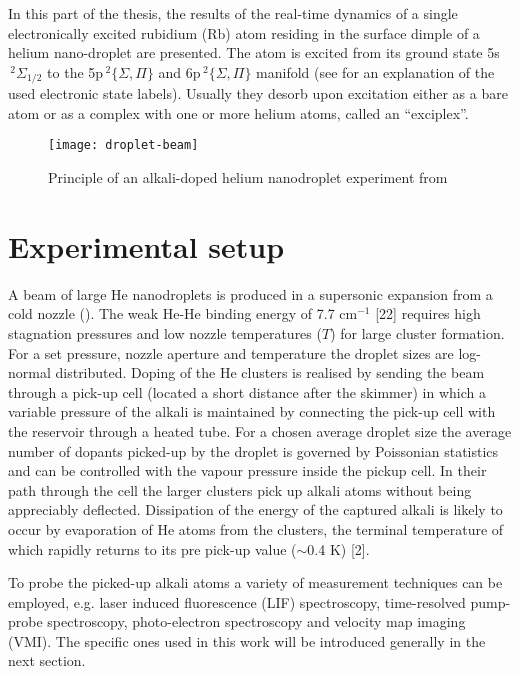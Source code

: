 	In this part of the thesis, the results of the real-time dynamics of a single electronically excited rubidium (Rb) atom residing in the surface dimple of a helium nano-droplet are presented. The atom is excited from its ground state 5s$\,^2\Sigma_{1/2}$ to the 5p$\,^2\{\Sigma,\Pi\}$ and 6p$\,^2\{\Sigma,\Pi\}$ manifold (see  for an explanation of the used electronic state labels). Usually they desorb upon excitation either as a bare atom or as a complex with one or more helium atoms, called an ``exciplex''.	
	\begin{figure}[t]
		\begin{center}
			\texttt{[image: droplet-beam]}
			\caption{Principle of an alkali-doped helium nanodroplet experiment from}
			\label{fig:droplet-beam}
		\end{center}
	\end{figure}
	
	\section*{Experimental setup}
	A beam of large He nanodroplets is produced in a supersonic expansion from a cold nozzle (). The weak He-He binding energy of 7.7 cm$^{-1}$ [22] requires high stagnation pressures and low nozzle temperatures ($T$) for large cluster formation. For a set pressure, nozzle aperture and temperature the droplet sizes are log-normal distributed. Doping of the He clusters is realised by sending the beam through a pick-up cell (located a short distance after the skimmer) in which a variable pressure of the alkali is maintained by connecting the pick-up cell with the reservoir through a heated tube. For a chosen average droplet size the average number of dopants picked-up by the droplet is governed by Poissonian statistics and can be controlled with the vapour pressure inside the pickup cell. In their path through the cell the larger clusters pick up alkali atoms without being appreciably deflected. Dissipation of the energy of the captured alkali is likely to occur by evaporation of He atoms from the clusters, the terminal temperature of which rapidly returns to its pre pick-up value ($\sim$0.4 K) [2].

	To probe the picked-up alkali atoms a variety of measurement techniques can be employed, e.g. laser induced fluorescence (LIF) spectroscopy, time-resolved pump-probe spectroscopy, photo-electron spectroscopy and velocity map imaging (VMI). The specific ones used in this work will be introduced generally in the next section.%
